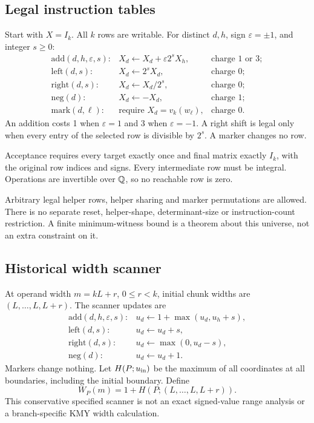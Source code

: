 \documentclass[11pt,letterpaper]{article}
\begin{document}
\subsection{Legal instruction tables}\label{sec:dsl}
Start with \(X=I_k\). All \(k\) rows are writable.
For distinct \(d,h\), sign \(\varepsilon=\pm1\), and integer \(s\ge0\):
\[
\begin{array}{lll}
\mathrm{add}(d,h,\varepsilon,s):
 &X_d\leftarrow X_d+\varepsilon2^sX_h,
 &\text{charge }1\text{ or }3;\\
\mathrm{left}(d,s):
 &X_d\leftarrow2^sX_d,&\text{charge }0;\\
\mathrm{right}(d,s):
 &X_d\leftarrow X_d/2^s,&\text{charge }0;\\
\mathrm{neg}(d):
 &X_d\leftarrow-X_d,&\text{charge }1;\\
\mathrm{mark}(d,\ell):
 &\text{require }X_d=v_k(w_\ell),&\text{charge }0.
\end{array}\tag{3}
\]
An addition costs 1 when \(\varepsilon=1\) and 3 when
\(\varepsilon=-1\). A right shift is legal only when every entry of
the selected row is divisible by \(2^s\). A marker changes no row.

Acceptance requires every target exactly once and final matrix
exactly \(I_k\), with the original row indices and signs.
Every intermediate row must be integral. Operations are invertible
over \(\mathbb Q\), so no reachable row is zero.

Arbitrary legal helper rows, helper sharing and marker permutations
are allowed. There is no separate reset, helper-shape, determinant-size
or instruction-count restriction. A finite minimum-witness bound is
a theorem about this universe, not an extra constraint on it.

\subsection{Historical width scanner}\label{sec:scanner}
At operand width \(m=kL+r\), \(0\le r<k\), initial chunk widths are
\((L,\ldots,L,L+r)\). The scanner updates are
\[
\begin{array}{ll}
\mathrm{add}(d,h,\varepsilon,s):&u_d\leftarrow1+\max(u_d,u_h+s),\\
\mathrm{left}(d,s):&u_d\leftarrow u_d+s,\\
\mathrm{right}(d,s):&u_d\leftarrow\max(0,u_d-s),\\
\mathrm{neg}(d):&u_d\leftarrow u_d+1.
\end{array}\tag{4}
\]
Markers change nothing. Let \(H(P;u_{\rm in})\) be the maximum of all
coordinates at all boundaries, including the initial boundary. Define
\[
W_P(m)=1+H(P;(L,\ldots,L,L+r)).\tag{5}
\]
This conservative specified scanner is not an exact signed-value
range analysis or a branch-specific KMY width calculation.
\end{document}

